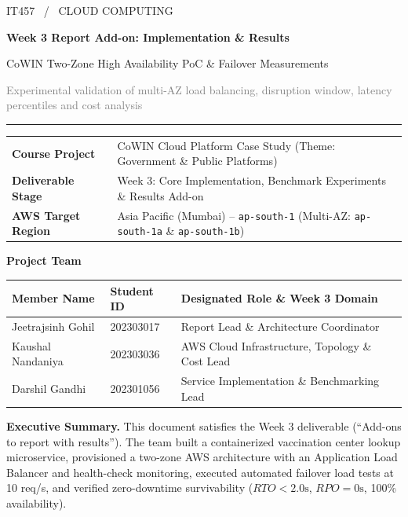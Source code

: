 \documentclass[11pt,a4paper]{article}
\begin{document}
\thispagestyle{empty}
{\color{teal}\large IT457 \ / \ CLOUD COMPUTING}\par\vspace{6mm}
{\color{navy}\LARGE\bfseries Week 3 Report Add-on: Implementation \& Results}\par\vspace{2mm}
{\Large CoWIN Two-Zone High Availability PoC \& Failover Measurements}\par\vspace{3mm}
\textcolor{graytext}{Experimental validation of multi-AZ load balancing, disruption window, latency percentiles and cost analysis}\par
\vspace{5mm}\hrule\vspace{5mm}

\begin{tabularx}{\textwidth}{@{}lY@{}}
\textbf{Course Project} & CoWIN Cloud Platform Case Study (Theme: Government \& Public Platforms) \\
\textbf{Deliverable Stage} & Week 3: Core Implementation, Benchmark Experiments \& Results Add-on \\
\textbf{AWS Target Region} & Asia Pacific (Mumbai) -- \texttt{ap-south-1} (Multi-AZ: \texttt{ap-south-1a} \& \texttt{ap-south-1b}) \\
\end{tabularx}
\par\vspace{5mm}

\textbf{Project Team}\par
\begin{tabularx}{\textwidth}{@{}Yll@{}}\toprule
\textbf{Member Name} & \textbf{Student ID} & \textbf{Designated Role \& Week 3 Domain}\\\midrule
Jeetrajsinh Gohil & 202303017 & Report Lead \& Architecture Coordinator\\
Kaushal Nandaniya & 202303036 & AWS Cloud Infrastructure, Topology \& Cost Lead\\
Darshil Gandhi & 202301056 & Service Implementation \& Benchmarking Lead\\\bottomrule
\end{tabularx}
\par\vspace{5mm}

\colorbox{pale}{\parbox{\dimexpr\textwidth-2\fboxsep\relax}{\textbf{Executive Summary.} This document satisfies the Week 3 deliverable (``Add-ons to report with results''). The team built a containerized vaccination center lookup microservice, provisioned a two-zone AWS architecture with an Application Load Balancer and health-check monitoring, executed automated failover load tests at 10 req/s, and verified zero-downtime survivability ($RTO < 2.0\text{s}$, $RPO = 0\text{s}$, 100\% availability).}}
\end{document}
